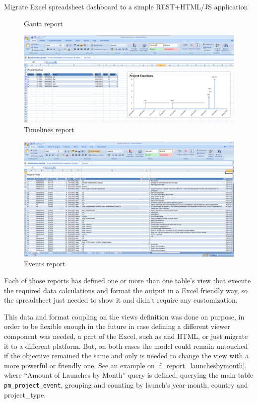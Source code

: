 \begin{part}{Migrate Excel spreadsheet dashboard to a simple REST+HTML/JS
application}
\begin{figure}[ht!]
   	\caption{Gantt report}
   	\label{f_report_gantt}
\end{figure}
\begin{figure}[ht!]
	\centering
   	\includegraphics[width=1\textwidth]{./resources/report_timelines.png}
   	\caption{Timelines report}
   	\label{f_report_timelines}
\end{figure}
\begin{figure}[ht!]
	\centering
   	\includegraphics[width=1\textwidth]{./resources/report_events.png}
   	\caption{Events report}
   	\label{f_report_events}
\end{figure}

Each of those reports has defined one or more than one table's view that execute
the required data calculations and format the output in a Excel friendly way, so
the spreadsheet just needed to show it and didn't require any customization. 

This data and format coupling on the views definition was done on purpose,
in order to be flexible enough in the future in case defining a different viewer
component was needed, a part of the Excel, such as and HTML, or just migrate it
to a different platform. But, on both cases the model could remain untouched if
the objective remained the same and only is needed to change the  view with a
more powerful or friendly one. See an example on
\ref{f_report_launchesbymonth}, where ``Amount of Launches by Month'' query 
is defined, querying the main table \texttt{pm\_project\_event}, grouping and
counting by launch's year-month, country and project\_type.


\end{part}
